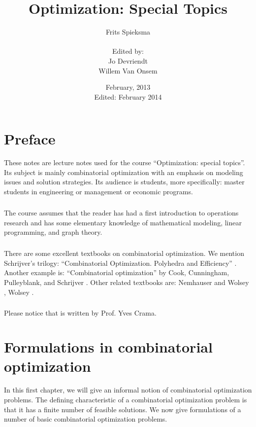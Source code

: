\documentclass[titlepage]{book}
\title{Optimization: Special Topics}
\author{Frits Spieksma\\ \\Edited by:\\Jo Devriendt\\Willem Van Onsem}
\date{February, 2013\\Edited: February 2014}
\theoremstyle{plain}
\theoremstyle{definition}
\theoremstyle{remark}
\begin{document}
\begin{titlepage}
\maketitle
\end{titlepage}
\tableofcontents
\chapter*{Preface}
These notes are lecture notes used for the course ``Optimization: special topics''. Its subject is mainly combinatorial optimization with an emphasis on modeling issues and solution strategies. Its audience is students, more specifically: master students in engineering or management or economic programs.

\paragraph{}
The course assumes that the reader has had a first introduction to operations research and has some elementary knowledge of mathematical modeling, linear programming, and graph theory.

\paragraph{}
There are some excellent textbooks on combinatorial optimization. We mention Schrijver's trilogy: ``Combinatorial Optimization. Polyhedra and Efficiency'' \cite{schrijver-book}. Another example is: ``Combinatorial optimization'' by Cook, Cunningham, Pulleyblank, and Schrijver \cite{Cook:98}. Other related textbooks are: Nemhauser and Wolsey \cite{citeulike:2212037}, Wolsey \cite{wolseyip}.

\paragraph{}
Please notice that  is written by Prof. Yves Crama.

\chapter{Formulations in combinatorial optimization}
In this first chapter, we will give an informal notion of combinatorial optimization problems. The defining characteristic of a combinatorial optimization problem is that it has a finite number of feasible solutions. We now give formulations of a number of basic combinatorial optimization problems.
\end{document}
